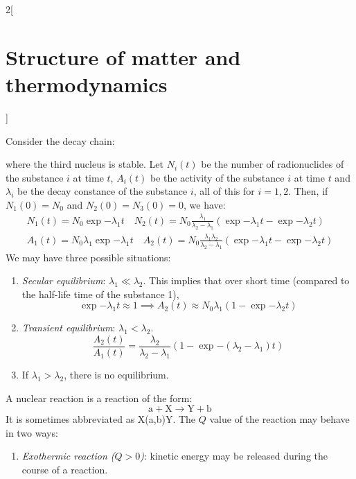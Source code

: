 \documentclass[../../../main.tex]{subfiles}
\begin{document}
\begin{multicols}{2}[\section{Structure of matter and thermodynamics}]
    \begin{prop}
        Consider the decay chain:
        \begin{center}
            \begin{minipage}{\linewidth}
                \centering
                
            \end{minipage}
        \end{center}
        where the third nucleus is stable.
        Let $N_i(t)$ be the number of radionuclides of the substance $i$ at time $t$, $A_i(t)$ be the activity of the substance $i$ at time $t$ and $\lambda_i$ be the decay constance of the substance $i$, all of this for $i=1,2$. Then, if $N_1(0)=N_0$ and $N_2(0)=N_3(0)=0$, we have:
        \begin{gather*}
            N_1(t)=N_0\exp{-\lambda_1t}\quad N_2(t) =N_0\frac{\lambda_1}{\lambda_2-\lambda_1}\left(\exp{-\lambda_1t}-\exp{-\lambda_2t}\right)         \\
            A_1(t)=N_0\lambda_1\exp{-\lambda_1t}\quad A_2(t)=N_0\frac{\lambda_1\lambda_2}{\lambda_2-\lambda_1}\left(\exp{-\lambda_1t}-\exp{-\lambda_2t}\right)
        \end{gather*}
        We may have three possible situations:
        \begin{enumerate}
            \item \textit{Secular equilibrium}: $\lambda_1\ll\lambda_2$. This implies that over short time (compared to the half-life time of the substance 1), $$\exp{-\lambda_1 t}\approx 1\implies A_2(t)\approx N_0\lambda_1(1-\exp{-\lambda_2t})$$
            \item \textit{Transient equilibrium}: $\lambda_1<\lambda_2$.
                  $$\frac{A_2(t)}{A_1(t)}=\frac{\lambda_2}{\lambda_2-\lambda_1}\left(1-\exp{-(\lambda_2-\lambda_1)t}\right)$$
            \item If $\lambda_1>\lambda_2$, there is no equilibrium.
        \end{enumerate}
    \end{prop}
    \begin{definition}
        A nuclear reaction is a reaction of the form:
        $$\text{a}+\text{X}\rightarrow\text{Y}+\text{b}$$
        It is sometimes abbreviated as X(a,b)Y. The $Q$ value of the reaction may behave in two ways:
        \begin{enumerate}
            \item \textit{Exothermic reaction ($Q>0$)}: kinetic energy may be released during the course of a reaction.

\end{enumerate}
\end{definition}
\end{multicols}
\end{document}
